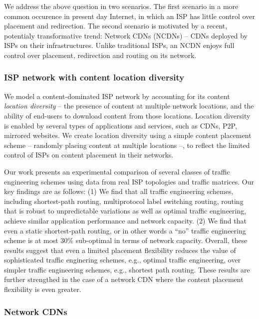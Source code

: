 We address the above question in two scenarios. The first scenario in a more common occurence in present day Internet, in which an ISP has little control over placement and redirection. The second scenario is motivated by a recent, potentialy transformative trend: Network CDNs (NCDNs) -- CDNs deployed by ISPs on their infrastructures. Unlike traditional ISPs, an NCDN enjoys full control over placement, redirection and routing on its network.

\subsubsection{ISP network with content location diversity}

We model a content-dominated ISP network by accounting for its content \emph{location diversity} -- the presence of content at multiple network locations, and the ability of end-users to download content from those locations. Location diversity is enabled by several types of applications and services, such as CDNs, P2P, mirrored websites. We create location diversity using a simple content placement scheme -- randomly placing content at multiple locations --, to reflect the limited control of ISPs on content placement in their networks. 


Our work presents an experimental comparison of several classes of traffic engineering schemes using data from real ISP topologies and traffic matrices. Our key findings are as follows: (1) We find that all traffic engineering schemes, including shortest-path routing, multiprotocol label switching routing, routing that is robust to unpredictable variations as well as optimal traffic engineering, achieve similar application performance and network capacity.   (2) We find that even a static shortest-path routing, or in other words a ``no'' traffic engineering  scheme is at most 30\% sub-optimal in terms of network capacity. Overall, these results suggest that even a limited placement flexibility reduces the value of sophisticated traffic enginering schemes, e.g., optimal traffic engineering, over simpler traffic engineering schemes, e.g., shortest path routing. These results are further strengthed in the case of a network CDN where the content placement flexibility is even greater.


\subsubsection{Network CDNs}

